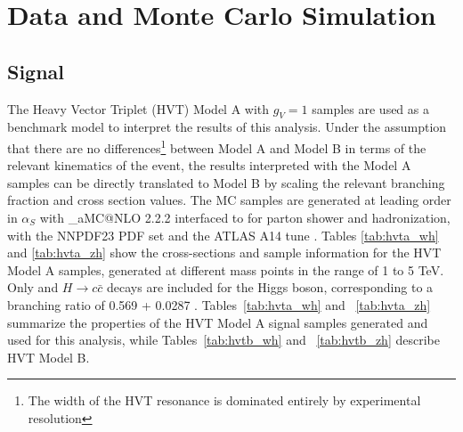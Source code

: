 
\section{Data and Monte Carlo Simulation}
\label{sec:samples}


\subsection{Signal}
The Heavy Vector Triplet (HVT) Model A with $g_{V}=1$ samples are used as a benchmark model to interpret the results of this analysis.
Under the assumption that there are no differences\footnote{The width of the HVT resonance is dominated entirely by experimental resolution} between Model A and Model B in terms of the relevant kinematics of the event, the results interpreted with the Model A samples can be directly translated to Model B by scaling the relevant branching fraction and cross section values.
The MC samples are generated at leading order in $\alpha_S$ with \_aMC@NLO 2.2.2 \cite{Alwall:2014hca} interfaced to  \cite{Sjostrand:2007gs} for parton shower and hadronization, with the NNPDF23 PDF set \cite{Ball:2011mu} and the ATLAS A14 tune \cite{ATL-PHYS-PUB-2014-021}. Tables \ref{tab:hvta_wh} and \ref{tab:hvta_zh} show the cross-sections and sample information for the HVT Model A samples, generated at different mass points in the range of 1 to 5 TeV.
Only \Hbb and $H\rightarrow c\bar{c}$ decays are included for the Higgs boson, corresponding to a branching ratio of 0.569 + 0.0287 \cite{Aad:2015gba}.
Tables~\ref{tab:hvta_wh} and ~\ref{tab:hvta_zh} summarize the properties of the HVT Model A signal samples generated and used for this analysis, while Tables~\ref{tab:hvtb_wh} and ~\ref{tab:hvtb_zh} describe HVT Model B.

